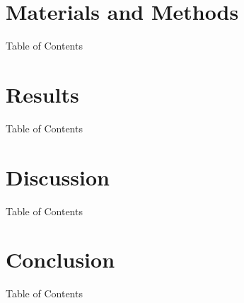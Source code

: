 \documentclass[aspectratio=43]{beamer}
\begin{document}
\section{Materials and Methods}



\begin{frame}{Table of Contents}
	\tableofcontents[currentsection]
\end{frame}
  

\section{Results}

\begin{frame}{Table of Contents}
	\tableofcontents[currentsection]
\end{frame}



\section{Discussion}

\begin{frame}{Table of Contents}
	\tableofcontents[currentsection]
\end{frame}



\section{Conclusion}

\begin{frame}{Table of Contents}
	\tableofcontents[currentsection]
\end{frame}
\end{document}
